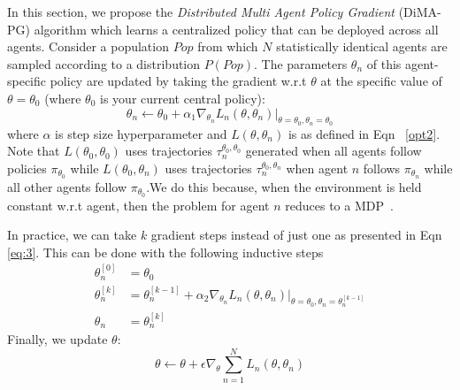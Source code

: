 \documentclass{article}
\begin{document}
In this section, we propose the \textit{Distributed Multi Agent Policy Gradient} (DiMA-PG) algorithm which learns a centralized policy that can be deployed across all agents. Consider a population $Pop$ from which $N$ statistically identical agents are sampled according to a distribution $P(Pop)$. The parameters $\theta_n$ of this agent-specific  policy are updated by taking the gradient w.r.t $\theta$ at the specific value of $\theta = \theta_0$ (where $\theta_0$ is your current central policy):
\begin{equation}
\label{eq:3}
\theta_n \leftarrow \theta_0 + \alpha_1 \nabla_{\theta_n} 
L_n(\theta,\theta_n)|_{\theta=\theta_0, \theta_n=\theta_0}
\end{equation}
where $\alpha$ is step size hyperparameter and 
$L(\theta,\theta_n)$ is as defined in Eqn ~\ref{opt2}. Note that $L(\theta_0, \theta_0)$ uses trajectories $\tau_n^{\theta_0, \theta_0}$ generated when all agents follow policies $\pi_{\theta_0}$ while $L(\theta_0, \theta_n)$ uses trajectories $\tau_n^{\theta_0, \theta_n}$ when agent $n$ follows $\pi_{\theta_n}$ while all other agents follow $\pi_{\theta_0}$.We do this because, when the environment is held constant w.r.t agent, then the problem for agent $n$ reduces to a MDP~\cite{sutton1998reinforcement}. 

In practice, we can take $k$ gradient steps instead of just one as presented in Eqn \ref{eq:3}. This can be done with the following inductive steps
\begin{equation}
\begin{aligned}
\label{eq:multi}
\theta_n^{[0]} &= \theta_0\\
\theta_n^{[k]} &= \theta_n^{[k-1]} + \alpha_2 \nabla_{\theta_n} 
L_n(\theta,\theta_n)|_{\theta=\theta_0, \theta_n=\theta_n^{[k-1]}}\\
\theta_n &= \theta_n^{[k]}
\end{aligned}
\end{equation}
Finally, we update $\theta$: 
\begin{equation}
\label{eq:7}
\theta \leftarrow \theta + \epsilon \nabla_{\theta} \sum_{n=1}^N  L_{n}(\theta, \theta_n)
\end{equation}
\end{document}
